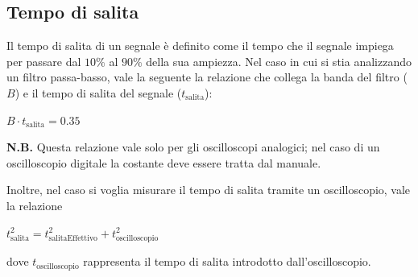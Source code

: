 \documentclass[a4paper]{article}
\begin{document}
		\subsection{Tempo di salita}
			Il tempo di salita di un segnale è definito come il tempo che il segnale impiega per passare dal $ 10\% $ al $ 90\% $ della sua ampiezza.
			\newline
			Nel caso in cui si stia analizzando un filtro passa-basso, vale la seguente la relazione che collega la banda del filtro ($ B $) e il tempo di salita del segnale ($ t_{\mathrm{salita}} $):
			\newline
			\begin{center}
				$ B \cdot t_{\mathrm{salita}} = 0.35 $
			\end{center}
			\newline
			\begin{scriptsize}
				\textbf{N.B.} Questa relazione vale solo per gli oscilloscopi analogici; nel caso di un oscilloscopio digitale la costante deve essere tratta dal manuale. 
			\end{scriptsize}
			\newline
			\newline
			Inoltre, nel caso si voglia misurare il tempo di salita tramite un oscilloscopio, vale la relazione
			\newline
			\begin{center}
				$ t_{\mathrm{salita}}^{2} = t_{\mathrm{salitaEffettivo}}^{2} + t_{\mathrm{oscilloscopio}}^{2} $
			\end{center}
			\newline
			dove $ t_{\mathrm{oscilloscopio}} $ rappresenta il tempo di salita introdotto dall’oscilloscopio.
\end{document}

